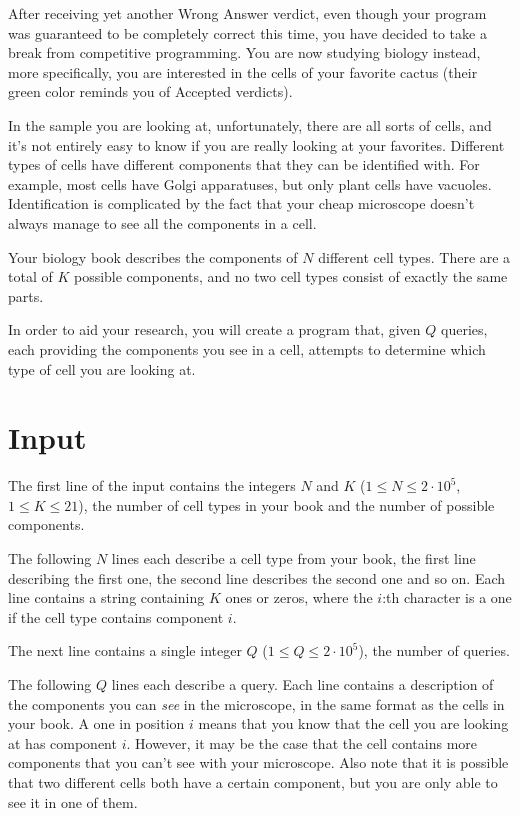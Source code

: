 \noindent
After receiving yet another Wrong Answer verdict, even though your program was guaranteed to be completely correct
this time, you have decided to take a break from competitive programming. You are now studying biology instead, more
specifically, you are interested in the cells of your favorite cactus (their green color reminds you of Accepted verdicts).

In the sample you are looking at, unfortunately, there are all sorts of cells, and it's not entirely easy to
know if you are really looking at your favorites. Different types of cells have different components that they
can be identified with. For example, most cells have Golgi apparatuses, but only plant cells have vacuoles.
Identification is complicated by the fact that your cheap microscope doesn't always manage to see all the components in a cell.

Your biology book describes the components of $N$ different cell types. There are a total of $K$ possible
components, and no two cell types consist of exactly the same parts.

In order to aid your research, you will create a program that, given $Q$ queries, each providing the components you see in
a cell, attempts to determine which type of cell you are looking at.

\section*{Input}
The first line of the input contains the integers $N$ and $K$ ($1 \leq N \leq 2 \cdot 10^5$, $1 \leq K \leq 21$),
the number of cell types in your book and the number of possible components.

The following $N$ lines each describe a cell type from your book, the first line describing the first one, 
the second line describes the second one and so on. Each line contains a string containing $K$ ones or zeros,
where the $i$:th character is a one if the cell type contains component $i$.

The next line contains a single integer $Q$ ($1 \leq Q \leq 2\cdot 10^5$), the number of queries.

The following $Q$ lines each describe a query. Each line contains a description of the components you can \textit{see}
in the microscope, in the same format as the cells in your book. A one in position $i$ means that you know that the cell
you are looking at has component $i$. However, it may be the case that the cell contains more components that you can't
see with your microscope. Also note that it is possible that two different cells both have a certain component, but
you are only able to see it in one of them.

